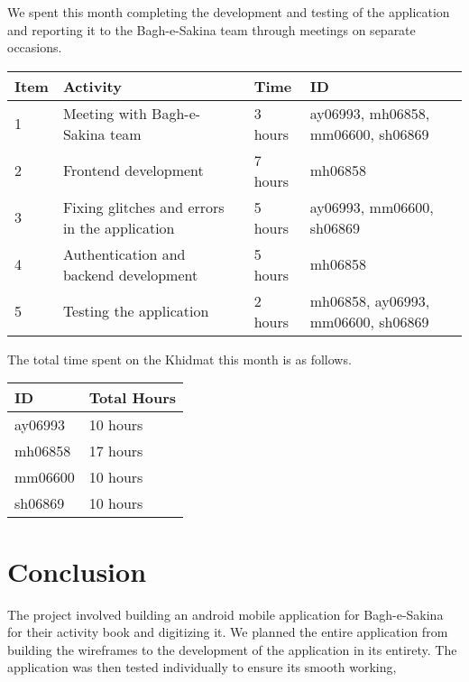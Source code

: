 \documentclass{article}
\begin{document}
We spent this month completing the development and testing of the application and reporting it to the Bagh-e-Sakina team through meetings on separate occasions. 

\vspace{1em}

\noindent \begin{tabular}{|l|l|l|l|}
  \hline
  Item & Activity & Time & ID \\ \hline
  1 & Meeting with Bagh-e-Sakina team & 3 hours & ay06993, mh06858, mm06600, sh06869 \\ \hline
  2 & Frontend development & 7 hours  & mh06858 \\ \hline
  3 & Fixing glitches and errors in the application & 5 hours  & ay06993, mm06600, sh06869 \\ \hline
  4 & Authentication and backend development & 5 hours & mh06858 \\ \hline
  5 & Testing the application & 2 hours & mh06858, ay06993, mm06600, sh06869 \\ \hline

\end{tabular}

\vspace{1em}

\noindent The total time spent on the Khidmat this month is as follows.

\vspace{1em}

\noindent \begin{tabular}{|l|l|}
  \hline
  ID & Total Hours \\\hline
  ay06993 & 10 hours \\ \hline
  mh06858 & 17 hours  \\ \hline
  mm06600 & 10 hours \\ \hline
  sh06869 & 10 hours \\ \hline
\end{tabular}

\newpage

\section*{Conclusion}

The project involved building an android mobile application for Bagh-e-Sakina for their activity book and digitizing it. We planned the entire application from building the wireframes to the development of the application in its entirety. The application was then tested individually to ensure its smooth working, 
\end{document}
